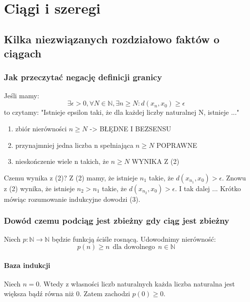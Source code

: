 \documentclass{article}
\begin{document}
\section{Ciągi i szeregi}

\subsection{Kilka niezwiązanych rozdziałowo faktów o ciągach}

\subsubsection{Jak przeczytać negację definicji granicy}
Jeśli mamy:
\begin{equation*}
    \exists \epsilon > 0, \forall N \in \mathbb{N}, \exists n \geq N: d(x_n, x_0) \geq \epsilon
\end{equation*}
to czytamy: "Istnieje epsilon taki, że dla każdej liczby naturalnej N, istnieje ..."

\begin{enumerate}
    \item  zbiór nierówności \(n \geq N\) -> BŁĘDNE I BEZSENSU
    \item przynajmniej jedna liczba n spełniająca \(n \geq N\) POPRAWNE
    \item nieskończenie wiele n takich, że \(n \geq N\) WYNIKA Z (2)
\end{enumerate}

Czemu wynika z (2)? Z (2) mamy, że istnieje \(n_1\) takie, że \(d(x_{n_1},x_0) > \epsilon\). 
Znowu z (2) wynika, że istnieje \(n_2>n_1\) takie, że \(d(x_{n_2},x_0)> \epsilon\). I tak dalej ...
Krótko mówiąc rozumowanie indukcyjne dowodzi (3).

\subsubsection{Dowód czemu podciąg jest zbieżny gdy ciąg jest zbieżny}

Niech \(p: \mathbb{N} \rightarrow \mathbb{N}\) będzie funkcją ściśle rosnącą.
Udowodnimy nierówność:
\begin{equation*}
    p(n) \geq n \ \ \mbox{dla dowolnego}  \ \ n \in \mathbb{N}
\end{equation*}


\paragraph{Baza indukcji}
Niech \(n = 0\). Wtedy z własności liczb naturalnych każda liczba naturalna
jest większa bądź równa niż \(0\). Zatem zachodzi \(p(0) \geq 0\).
\end{document}
